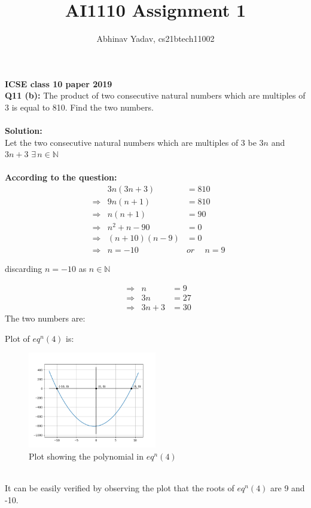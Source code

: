 \documentclass[journal, 12pt, twocolumn]{IEEEtran}
\title{AI1110 Assignment 1}
\author{Abhinav Yadav, cs21btech11002}
\begin{document}
    \maketitle

    \textbf{ICSE class 10 paper 2019}\\
    \textbf{Q11 (b):}
    The product of two consecutive natural numbers which are multiples of 3 is 
    equal to 810. Find the two numbers.\\\\
    \textbf{Solution:}\\
    Let the two consecutive natural numbers which are multiples of $3$ be $3n$ and $3n+3$
    \hspace{5pt} $\exists \hspace{2pt} n \in \mathbb{N}$\\\\
    \textbf{According to the question:}
    \begin{align}
        &&3n(3n+3) &= 810\\
        &\Rightarrow & 9n(n+1) &= 810\\
        &\Rightarrow & n(n+1) &= 90\\
        &\Rightarrow & n^2+n-90 &= 0\hspace{25pt}\\
        &\Rightarrow & (n+10)(n-9) &= 0\\
        &\Rightarrow & n=-10 \hspace{15pt} &or \hspace{15pt} n=9
    \end{align}
    \begin{center}
        discarding $n=-10$ as $n \in \mathbb{N}$
    \end{center}
    \begin{align}
        &\Rightarrow & n &= 9\\
        &\Rightarrow & 3n &= 27\\
        &\Rightarrow & 3n+3 &= 30
    \end{align}
    The two numbers are:\vspace{200pt}
    \pagebreak

    Plot of $eq^n(4)$ is:
    \begin{figure}[h]
        \centering
        \includegraphics[width=0.5\textwidth]{plot.png}
        \caption{Plot showing the polynomial in $eq^n(4)$}
        \label{Fig1}
    \end{figure}\\
    It can be easily verified by observing the plot that the roots of $eq^n (4)$ are 9 and -10.\\\\
\end{document}
